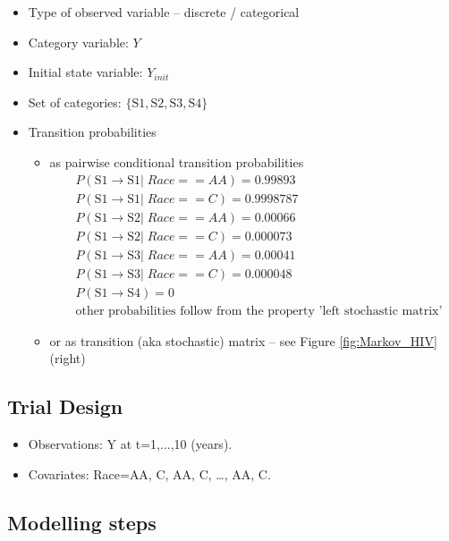 \begin{itemize}
\item
Type of observed variable -- discrete / categorical
\item
Category variable: $Y$
\item
Initial state variable: $Y_{init}$
\item
Set of categories: $\{\mbox{S1}, \mbox{S2}, \mbox{S3}, \mbox{S4}\}$
\item
Transition probabilities
\begin{itemize}
\item
as pairwise conditional transition probabilities
\begin{align}
& P(\mbox{S1} \rightarrow \mbox{S1} | \; Race==AA) = 0.99893 \nonumber \\
& P(\mbox{S1} \rightarrow \mbox{S1} | \; Race==C) = 0.9998787 \nonumber \\
& P(\mbox{S1} \rightarrow \mbox{S2} | \; Race==AA) = 0.00066 \nonumber \\
& P(\mbox{S1} \rightarrow \mbox{S2} | \; Race==C) = 0.000073 \nonumber \\
& P(\mbox{S1} \rightarrow \mbox{S3} | \; Race==AA) = 0.00041 \nonumber \\
& P(\mbox{S1} \rightarrow \mbox{S3} | \; Race==C) = 0.000048 \nonumber \\
& P(\mbox{S1} \rightarrow \mbox{S4}) = 0 \nonumber \\
& \mbox{other probabilities follow from the property 'left stochastic matrix'} \nonumber
\end{align}
\item
or as transition (aka stochastic) matrix -- see Figure \ref{fig:Markov_HIV} (right)
\end{itemize}
\end{itemize}

\subsection*{Trial Design}

\begin{itemize}
\item
Observations: Y at t=1,...,10 (years).
\item
Covariates: Race={AA, C, AA, C, \dots, AA, C}.
\end{itemize}

\subsection*{Modelling steps}

